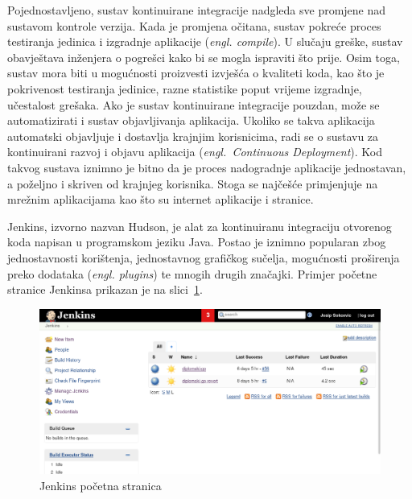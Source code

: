 Pojednostavljeno, sustav kontinuirane integracije nadgleda sve promjene nad sustavom kontrole
verzija. Kada je promjena očitana, sustav pokreće proces testiranja jedinica i izgradnje aplikacije
(\textit{engl. compile}). U slučaju greške, sustav obavještava inženjera o pogrešci kako bi se mogla
ispraviti što prije. Osim toga, sustav mora biti u mogućnosti proizvesti izvješća o kvaliteti koda,
kao što je pokrivenost testiranja jedinice, razne statistike poput vrijeme izgradnje, učestalost
grešaka. Ako je sustav kontinuirane integracije pouzdan, može se automatizirati i sustav
objavljivanja aplikacija. Ukoliko se takva aplikacija automatski objavljuje i dostavlja krajnjim
korisnicima, radi se o sustavu za kontinuirani razvoj i objavu aplikacija (\textit{engl.~Continuous
Deployment}). Kod takvog sustava iznimno je bitno da je proces nadogradnje aplikacije jednostavan, a
poželjno i skriven od krajnjeg korisnika. Stoga se najčešće primjenjuje na mrežnim aplikacijama kao
što su internet aplikacije i stranice.

Jenkins, izvorno nazvan Hudson, je alat za kontinuiranu integraciju otvorenog koda napisan u
programskom jeziku Java. Postao je iznimno popularan zbog jednostavnosti korištenja, jednostavnog
grafičkog sučelja, mogućnosti proširenja preko dodataka (\textit{engl. plugins}) te mnogih drugih
značajki. Primjer početne stranice Jenkinsa prikazan je na slici~\ref{fig:02jenkins_home}.

\begin{figure}[h]
    \centering
    \includegraphics[width=\textwidth]{img/02/jenkins_home.png}
    \caption{Jenkins početna stranica}%
    \label{fig:02jenkins_home}
\end{figure}

